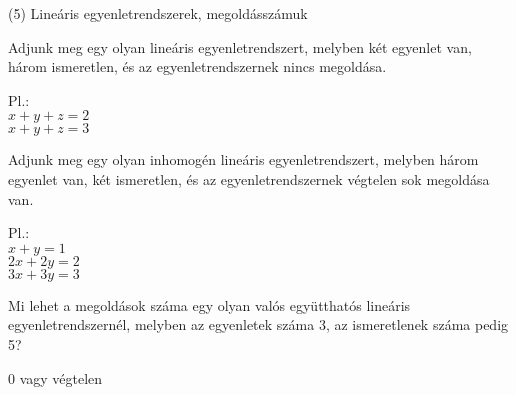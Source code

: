 \begin{frame}[plain]
\begin{tcolorbox}[center, colback={myyellow}, coltext={black}, colframe={myyellow}]
    {\RHuge  (5) Lineáris egyenletrendszerek, megoldásszámuk}
    \mmedskip
\end{tcolorbox}
\end{frame}

\begin{frame}
  \begin{tcolorbox}[title={5/1. {\symknight}}]
      Adjunk meg egy olyan lineáris egyenletrendszert, melyben két egyenlet van, három ismeretlen, és az egyenletrendszernek nincs megoldása.
  \tcblower

    \mmedskip 
    
    Pl.:\\
$x + y + z = 2$\\
$x + y + z = 3$
  \end{tcolorbox}
\end{frame}


\begin{frame}
  \begin{tcolorbox}[title={5/2. {\symknight}}]
      Adjunk meg egy olyan inhomogén lineáris egyenletrendszert, melyben három egyenlet van, két ismeretlen, és az egyenletrendszernek végtelen sok megoldása van.
  \tcblower

    \mmedskip 
    
    Pl.:\\
$x + y = 1$\\
$2x + 2y = 2$\\
$3x + 3y = 3$

  \end{tcolorbox}
\end{frame}


\begin{frame}
  \begin{tcolorbox}[title={5/3. {\symknight}}]
      Mi lehet a megoldások száma egy olyan valós együtthatós lineáris egyenletrendszernél, melyben az egyenletek száma 3, az ismeretlenek száma pedig 5?
  \tcblower

    \mmedskip 
    
    0 vagy végtelen
  \end{tcolorbox}
\end{frame}


